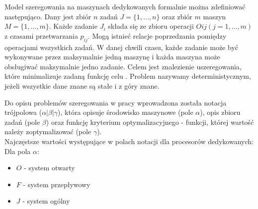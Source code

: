 \documentclass[brudnopis]{xmgr}
\begin{document}
Model szeregowania na maszynach dedykowanych formalnie można zdefiniować następująco. Dany jest zbiór $n$ zadań $J=\{1, ..., n\}$ oraz zbiór $m$ maszyn $M=\{1, ..., m\}$.
Każde zadanie $J_i$ składa się ze zbioru operacji $Oij (j=1, ..., m)$ z czasami przetwarzania $p_{ij}$.
Mogą istnieć relacje poprzedzania pomiędzy operacjami wszystkich zadań.
W danej chwili czasu, każde zadanie może być wykonywane przez maksymalnie jedną maszynę i każda maszyna może obsługiwać maksymalnie jedno zadanie.
Celem jest znalezienie uszeregowania, które minimalizuje zadaną funkcję celu \cite{brucker2007scheduling}. Problem nazywamy deterministycznym, jeżeli wszystkie dane znane są stałe i z góry znane.


Do opisu problemów szeregowania w pracy \cite{graham1979optimization} wprowadzona została notacja trójpolowa ($\alpha|\beta|\gamma$), która opisuje środowisko maszynowe (pole $\alpha$), opis zbioru zadań (pole $\beta$) oraz funkcję kryterium optymalizacyjnego - funkcji, której wartość należy zoptymalizować (pole $\gamma$).\\

Najczęstsze wartości występujące w polach notacji dla procesorów dedykowanych:\\

Dla pola $\alpha$:
\begin{itemize}
    \item $O$ - system otwarty
    \item $F$ - system przepływowy
    \item $J$ - system ogólny
\end{itemize}
\end{document}
